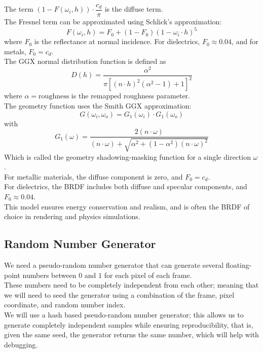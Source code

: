 \documentclass[12pt]{article}
\begin{document}
The term $(1 - F(\omega_i, h)) 
\cdot \dfrac{c_d}{\pi}$ is the diffuse term. \\

The Fresnel term can be approximated using 
Schlick's approximation:
\[ F(\omega_i, h) = F_0 + (1 - F_0)
(1 - \omega_i \cdot h)^5 \]
where $F_0$ is the reflectance at normal incidence. 
For dielectrics, $F_0 \approx 0.04$, 
and for metals, $F_0 = c_d$. \\

The GGX normal distribution function is defined as
\[ D(h) = \frac{\alpha^2}{\pi \left[ 
(n \cdot h)^2 (\alpha^2 - 1) + 1 \right]^2} \]
where $\alpha = \text{roughness}$ 
is the remapped roughness parameter. \\

The geometry function uses the Smith GGX approximation:
\[ G(\omega_i, \omega_o) = 
G_1(\omega_i) \cdot G_1(\omega_o) \]
with
\[ G_1(\omega) = \frac{2 (n \cdot \omega)}
{(n \cdot \omega) + \sqrt{\alpha^2 + (1 - \alpha^2)
(n \cdot \omega)^2}} \]
Which is called the geometry shadowing-masking 
function for a single direction $\omega$. \\

For metallic materials, 
the diffuse component is zero, and 
$F_0 = c_d$. \\ 
For dielectrics, the BRDF includes both 
diffuse and specular components, 
and $F_0 \approx 0.04$. \\

This model ensures energy conservation and 
realism, and is often the BRDF of choice
in rendering and physics simulations. \\

\newpage

\subsection*{Random Number Generator}

We need a pseudo-random number generator that
can generate several 
floating-point numbers between $0$
and $1$ for each pixel of each frame. \\

These numbers need to be completely independent
from each other; meaning that we will need to
seed the generator using a combination of the frame,
pixel coordinate, and random number index. \\

We will use a hash based pseudo-random number
generator; this allows us to generate completely
independent samples while ensuring reproducibility,
that is, given the same seed, the generator returns
the same number, which will help with debugging. \\
\end{document}
